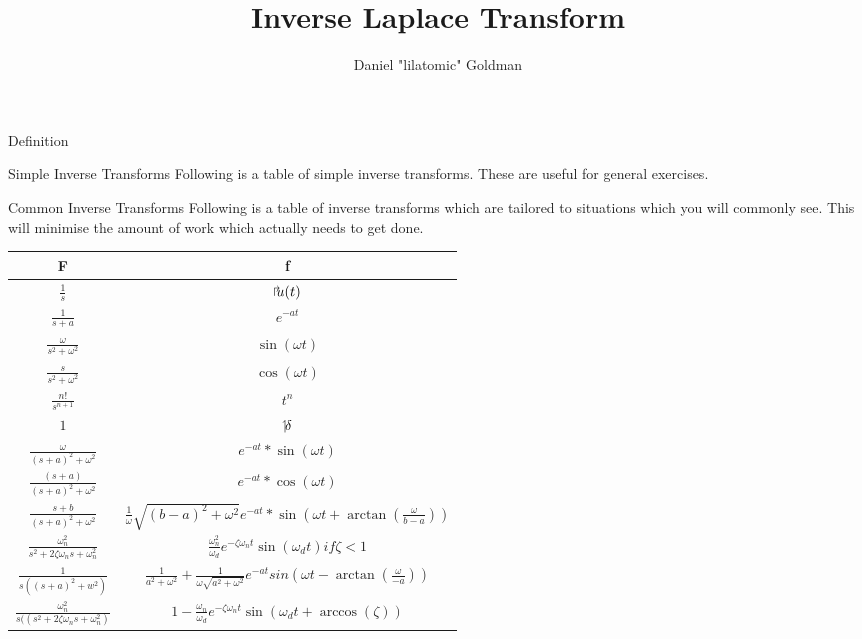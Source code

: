 \documentclass{../templates/mathtool}
\title{Inverse Laplace Transform}
\author{Daniel "lilatomic" Goldman}
\begin{document}
\maketitle

\begin{section}{Definition}
\end{section}

\begin{section}{Simple Inverse Transforms}
	Following is a table of simple inverse transforms. These are useful for general exercises.
\end{section}

\begin{section}{Common Inverse Transforms}
	Following is a table of inverse transforms which are tailored to situations which you will commonly see. This will minimise the amount of work which actually needs to get done.
	
\end{section}
	\begin{tabular}{|c|c|}
		\hline
		F & f \\
		\hline \hline
		$\frac{1}{s}$ & $\ustep(t)$ \\
			\hline
		$\frac{1}{s+a}$ & $e^{-at}$ \\
			\hline
		$\frac{\omega}{s^2+\omega^2}$ & $\sin{(\omega t)}$ \\
			\hline
		$\frac{s}{s^2+\omega^2}$ & $\cos{(\omega t)}$ \\
			\hline
		$\frac{n!}{s^{n+1}}$ & $t^n$ \\
			\hline
		$1$ & $\impulse$ \\
			\hline
		$\frac{\omega}{(s+a)^2+\omega^2}$ & $e^{-at}*\sin{(\omega t)}$ \\
			\hline
		$\frac{(s+a)}{(s+a)^2+\omega^2}$ & $e^{-at}*\cos{(\omega t)}$ \\
			\hline
		$\frac{s+b}{(s+a)^2+\omega^2}$ & $\frac{1}{\omega}\sqrt{(b-a)^2+\omega^2} e^{-at}*\sin{(\omega t+\arctan(\frac{\omega}{b-a}))}$ \\
			\hline
		$\frac{\omega_n^2}{s^2+2\zeta\omega_n s+\omega_n^2}$ & $\frac{\omega_n^2}{\omega_d}e^{-\zeta\omega_n t}\sin{(\omega_d t)} if \zeta < 1$ \\
			\hline
		$\frac{1}{s((s+a)^2+w^2)}$ & $\frac{1}{a^2+\omega^2}+\frac{1}{\omega\sqrt{a^2+\omega^2}}e^{-at}sin{(\omega t - \arctan{(\frac{\omega}{-a})})}$ \\
			\hline
		$\frac{\omega_n^2}{s((s^2 + 2\zeta\omega_n s + \omega_n^2)}$ & $1-\frac{\omega_n}{\omega_d}e^{-\zeta\omega_n t}\sin{(\omega_d t + \arccos{(\zeta)})}$ \\
		\hline
	\end{tabular}
	
\end{document}
